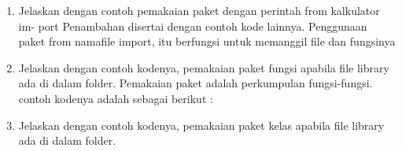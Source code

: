 \begin{enumerate}
    \item Jelaskan dengan contoh pemakaian paket dengan perintah from kalkulator im-
    port Penambahan disertai dengan contoh kode lainnya.
    Penggunaan paket from namafile import, itu berfungsi untuk memanggil file dan fungsinya
    

    \item Jelaskan dengan contoh kodenya, pemakaian paket fungsi apabila file library
    ada di dalam folder.
    Pemakaian paket adalah perkumpulan fungsi-fungsi. contoh kodenya adalah sebagai berikut :
	

    \item Jelaskan dengan contoh kodenya, pemakaian paket kelas apabila file library ada
    di dalam folder.
    

	\end{enumerate}

